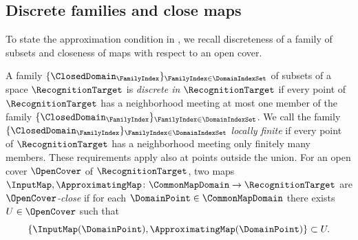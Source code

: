 \subsection{Discrete families and close maps}\label{subsec:hilbert-preliminaries-discrete}
To state the approximation condition in ,
we recall discreteness of a family of subsets and closeness of maps
with respect to an open cover.

\begin{definition}\label{def:discrete-family}
A family
$\{\ClosedDomain _\FamilyIndex \}_{\FamilyIndex \in \DomainIndexSet }$
of subsets of a space
$\RecognitionTarget $
is \emph{discrete in}
$\RecognitionTarget $
if every point of
$\RecognitionTarget $
has a neighborhood meeting at most one member of the family
$\{\ClosedDomain_\FamilyIndex\}_{\FamilyIndex\in\DomainIndexSet}$.
We call the family
$\{\ClosedDomain_\FamilyIndex\}_{\FamilyIndex\in\DomainIndexSet}$
\emph{locally finite} if every point of
$\RecognitionTarget$
has a neighborhood meeting only finitely many members.
These requirements apply also at points outside the union.
For an open cover
$\OpenCover$
of
$\RecognitionTarget $,
two maps
$\InputMap ,\ApproximatingMap \colon \CommonMapDomain \to \RecognitionTarget $
are
\emph{$\OpenCover$-close}
if for each
$\DomainPoint \in \CommonMapDomain $
there exists
$U\in\OpenCover$
such that
\[
 \{\InputMap(\DomainPoint),\ApproximatingMap(\DomainPoint)\}\subset U.
\]
\end{definition}
